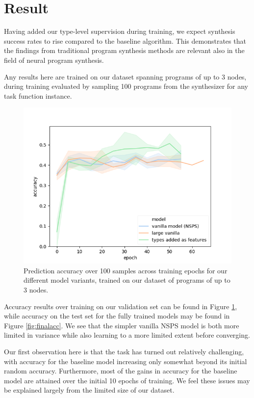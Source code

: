 \documentclass{article}
\begin{document}

\section{Result} \label{sec:result}

Having added our type-level supervision during training, we expect synthesis success rates to rise
compared to the baseline algorithm.
This demonstrates that the findings from traditional program synthesis methods are relevant also in the field of neural program synthesis.

Any results here are trained on our dataset spanning programs of up to 3 nodes,
during training evaluated by sampling 100 programs from the synthesizer for any task function instance.

\begin{figure}[h]
    \includegraphics[scale=0.7]{figures/experiments.png}
    \caption{
        Prediction accuracy over 100 samples across training epochs for our different model variants,
        trained on our dataset of programs of up to 3 nodes.
    }
    \label{fig:accuracy}
\end{figure}

Accuracy results over training on our validation set can be found in Figure \ref{fig:accuracy},
while accuracy on the test set for the fully trained models may be found in Figure \ref{fig:finalacc}.
We see that the simpler vanilla NSPS model is both more limited in variance while also learning to a more limited extent before converging.

Our first observation here is that the task has turned out relatively challenging,
with accuracy for the baseline model increasing only somewhat beyond its initial random accuracy.
Furthermore, most of the gains in accuracy for the baseline model are attained over the initial 10 epochs of training.
We feel these issues may be explained largely from the limited size of our dataset.
\end{document}
